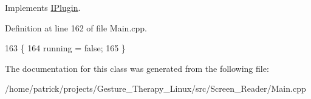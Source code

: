 Implements \hyperlink{class_i_plugin_a86e523c283aec5c9fb21249a76e916ac}{I\+Plugin}.



Definition at line 162 of file Main.\+cpp.


\begin{DoxyCode}
163 \{
164     running = \textcolor{keyword}{false};
165 \}
\end{DoxyCode}


The documentation for this class was generated from the following file\+:\begin{DoxyCompactItemize}
\item 
/home/patrick/projects/\+Gesture\+\_\+\+Therapy\+\_\+\+Linux/src/\+Screen\+\_\+\+Reader/Main.\+cpp\end{DoxyCompactItemize}
